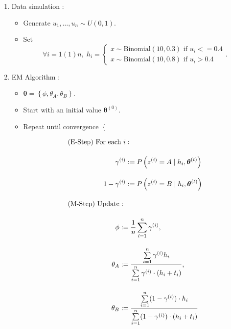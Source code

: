 \documentclass[11pt, a4paper]{article}\usepackage[]{graphicx}\usepackage[]{xcolor}
\newcommand{\bs}[1]{\boldsymbol{#1}}
\begin{document}
\begin{enumerate}

\item[\scalebox{2.0}{\twemoji{keycap: 1}}] \hspace{0.2cm} Data simulation :

\begin{itemize}
\item Generate $u_1, \ldots, u_n \sim U(0, 1)$.

\item Set $$\forall i = 1(1)n, \; h_i = \begin{cases} x \sim \text{Binomial}(10, 0.3) \text{ if } u_i <= 0.4 \\[0.5em] x \sim \text{Binomial}(10, 0.8)\text{ if } u_i > 0.4 \end{cases}.$$
\end{itemize}

\newpage

\item[\scalebox{2.0}{\twemoji{keycap: 2}}] \hspace{0.2cm} EM Algorithm :

\begin{itemize}
\item $\bs{\theta} = \left\{ \phi, \theta_A, \theta_B \right\}$.

\item Start with an initial value $\bs{\theta}^{(0)}$.

\item Repeat until convergence $\left\{ \right.$

\begin{align*}
&\text{(E-Step) } 
\begin{aligned}[t]
\text{For each } i &: \\[1em]
\gamma^{(i)} &:= P \left( z^{(i)} = A \mid h_i, \bs{\theta}^{(t)} \right) \\[1em]
1 - \gamma^{(i)} &:= P \left( z^{(i)} = B \mid h_i, \bs{\theta}^{(t)} \right)
\end{aligned}\\[1em]
&\text{(M-Step) } 
\begin{aligned}[t]
\text{Update} &: \\[1em]
\hspace{-2em}\phi &:= \dfrac{1}{n} \sum \limits_{i=1}^{n}\gamma^{(i)}, \\[1em]
{\theta}_A &:= \dfrac{\sum \limits_{i = 1}^{n} \gamma^{(i)} h_i}{\sum \limits_{i = 1}^{n} \gamma^{(i)} \cdot (h_i + t_i)}, \\[1em]
{\theta}_B &:= \dfrac{\sum \limits_{i=1}^{n} (1 - \gamma^{(i)}) \cdot h_i}{\sum \limits_{i=1}^{n} (1 - \gamma^{(i)}) \cdot (h_i + t_i)}
\end{aligned}
\end{align*}


\end{itemize}
\end{enumerate}
\end{document}
